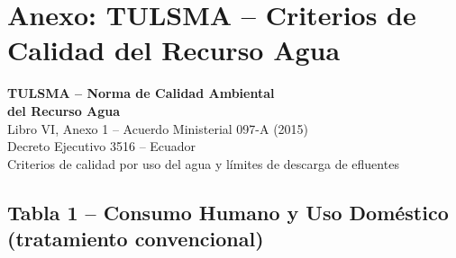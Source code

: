 \documentclass[12pt,a4paper]{article}
\begin{document}
\newpage
\appendix
\section{Anexo: TULSMA -- Criterios de Calidad del Recurso Agua}
\label{app:tulsma}

\begin{center}
{\LARGE\bfseries TULSMA -- Norma de Calidad Ambiental\\[4pt]
del Recurso Agua}\\[8pt]
{\large Libro VI, Anexo 1 -- Acuerdo Ministerial 097-A (2015)\\
Decreto Ejecutivo 3516 -- Ecuador}\\[4pt]
{\small Criterios de calidad por uso del agua y l\'imites de descarga de efluentes}
\end{center}
\vspace{10pt}

\subsection{Tabla 1 -- Consumo Humano y Uso Dom\'estico (tratamiento convencional)}
\end{document}
